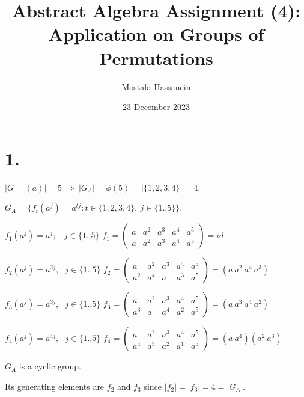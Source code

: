 \documentclass{article}
\author{Mostafa Hassanein}
\title{Abstract Algebra Assignment (4): Application on Groups of Permutations}
\date{23 December 2023}
\begin{document}
\maketitle

\newpage

\section*{1.}
 $|G=(a)| = 5 \ \Rightarrow \ |G_A| = \phi(5) = |\{1, 2, 3, 4\}| = 4$.
\newline

\noindent
$G_A = \{f_t(a^j) = a^{tj}: t \in \{1, 2, 3, 4\},\ j \in \{1..5\} \}$.
\newline

\noindent
$f_1(a^j) = a^{j}; \ \ \ \ j \in \{1..5\}$
\newline
\noindent
$f_1 = \begin{pmatrix}
  a & a^2 & a^3 & a^4 & a^5\\
  a & a^2 & a^3 & a^4 & a^5
\end{pmatrix} = id$
\newline

\noindent
$f_2(a^j) = a^{2j}, \ \ \ j \in \{1..5\}$
\newline
\noindent
$f_2 = \begin{pmatrix}
  a & a^2 & a^3 & a^4 & a^5 \\
  a^2 & a^4 & a & a^3 & a^5
\end{pmatrix} = (a \ a^2 \ a^4 \ a^3)$
\newline


\noindent
$f_3(a^j) = a^{3j}, \ \ \ j \in \{1..5\}$
\newline
\noindent
$f_3 = \begin{pmatrix}
  a & a^2 & a^3 & a^4 & a^5 \\
  a^3 & a & a^4 & a^2 & a^5
\end{pmatrix} = (a \ a^3 \ a^4 \ a^2)$
\newline

\noindent
$f_4(a^j) = a^{4j}, \ \ \ j \in \{1..5\}$
\newline
\noindent
$f_4 = \begin{pmatrix}
  a & a^2 & a^3 & a^4 & a^5 \\
  a^4 & a^3 & a^2 & a^1 & a^5
\end{pmatrix} = (a \ a^4)(a^2 \ a^3)$
\newline

\noindent
$G_A$ is a cyclic group.

\noindent
Its generating elements are $f_2$ and $f_3$ since $|f_2|=|f_3|=4=|G_A|$.
\end{document}
